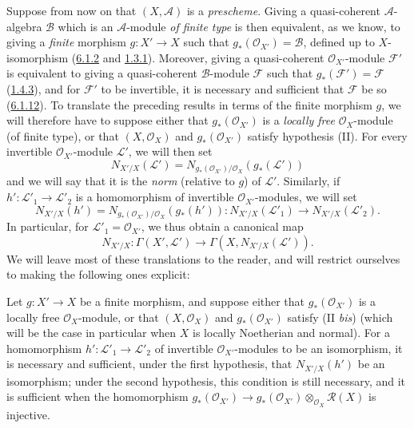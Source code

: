 \begin{env}[6.5.5]
\label{II.6.5.5}
Suppose from now on that $(X,\mathcal{A})$ is a \emph{prescheme}. Giving a
quasi-coherent $\mathcal{A}$-algebra $\mathcal{B}$ which is an
$\mathcal{A}$-module \emph{of finite type} is then equivalent, as we know,
to giving a \emph{finite} morphism $g:X'\to X$ such that
$g_*(\mathcal{O}_{X'})=\mathcal{B}$, defined up to $X$-isomorphism
(\hyperref[II.6.1.2]{6.1.2} and \hyperref[II.1.3.1]{1.3.1}). Moreover,
giving a quasi-coherent $\mathcal{O}_{X'}$-module $\mathcal{F}'$ is
equivalent to giving a quasi-coherent $\mathcal{B}$-module $\mathcal{F}$ such
that $g_*(\mathcal{F}')=\mathcal{F}$ (\hyperref[II.1.4.3]{1.4.3}), and for
$\mathcal{F}'$ to be invertible, it is necessary and sufficient that
$\mathcal{F}$ be so (\hyperref[II.6.1.12]{6.1.12}). To translate the
preceding results in terms of the finite morphism $g$, we will therefore have
to suppose either that $g_*(\mathcal{O}_{X'})$ is a \emph{locally free}
$\mathcal{O}_X$-module (of finite type), or that $(X,\mathcal{O}_X)$ and
$g_*(\mathcal{O}_{X'})$ satisfy hypothesis (II). For every invertible
$\mathcal{O}_{X'}$-module $\mathcal{L}'$, we will then set
\[
\label{II.6.5.5.1}
N_{X'/X}(\mathcal{L}')
=N_{g_*(\mathcal{O}_{X'})/\mathcal{O}_X}(g_*(\mathcal{L}'))
\tag{6.5.5.1}
\]
and we will say that it is the \emph{norm} (relative to $g$) of
$\mathcal{L}'$. Similarly, if $h':\mathcal{L}'_1\to\mathcal{L}'_2$ is a
homomorphism of invertible $\mathcal{O}_{X'}$-modules, we will set
\[
\label{II.6.5.5.2}
N_{X'/X}(h')
=N_{g_*(\mathcal{O}_{X'})/\mathcal{O}_X}(g_*(h')):
N_{X'/X}(\mathcal{L}'_1)\to N_{X'/X}(\mathcal{L}'_2).
\tag{6.5.5.2}
\]
In particular, for $\mathcal{L}'_1=\mathcal{O}_{X'}$, we thus obtain a
canonical map
\[
\label{II.6.5.5.3}
N_{X'/X}:\Gamma(X',\mathcal{L}')
\to\Gamma(X,N_{X'/X}(\mathcal{L}')).
\tag{6.5.5.3}
\]
We will leave most of these translations to the reader, and will restrict
ourselves to making the following ones explicit:
\end{env}

\begin{proposition}[6.5.6]
\label{II.6.5.6}
Let $g:X'\to X$ be a finite morphism, and suppose either that
$g_*(\mathcal{O}_{X'})$ is a locally free $\mathcal{O}_X$-module, or that
$(X,\mathcal{O}_X)$ and $g_*(\mathcal{O}_{X'})$ satisfy (II \emph{bis})
(which will be the case in particular when $X$ is locally Noetherian and
normal). For a homomorphism $h':\mathcal{L}'_1\to\mathcal{L}'_2$ of
invertible $\mathcal{O}_{X'}$-modules to be an isomorphism, it is necessary
and sufficient, under the first hypothesis, that $N_{X'/X}(h')$ be an
isomorphism; under the second hypothesis, this condition is still necessary,
and it is sufficient when the homomorphism
$g_*(\mathcal{O}_{X'})\to
g_*(\mathcal{O}_{X'})\otimes_{\mathcal{O}_X}\mathcal{R}(X)$ is injective.
\end{proposition}

